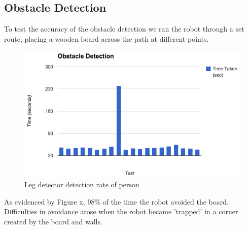 \documentclass{article}
\begin{document}
	\subsection{Obstacle Detection}
	To test the accuracy of the obstacle detection we ran the robot through a set route, placing a wooden board across the path at different points.
	\begin{figure}[H]
	\begin{center}
	\includegraphics[width=0.8\linewidth]{ExperimentalResults12}
	\caption{Leg detector detection rate of person}
	\end{center}
	\end{figure}
	As evidenced by Figure x, 98\% of the time the robot avoided the board. Difficulties in avoidance arose when the robot became 'trapped' in a corner created by the board and walls.
	
\end{document}

